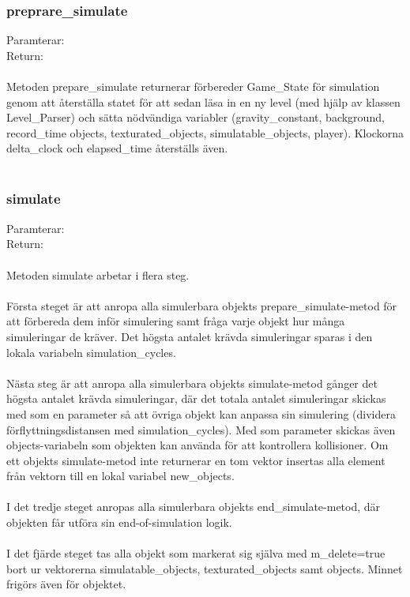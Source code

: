 \documentclass{TDP003mall}
\begin{document}
\subsubsection{preprare\_simulate}
Paramterar: \textit{}
\\Return: \textit{}
\\\\
Metoden prepare\_simulate returnerar förbereder Game\_State för simulation genom att återställa statet för att sedan läsa in en ny level (med hjälp av klassen Level\_Parser) och sätta nödvändiga variabler (gravity\_constant, background, record\_time objects, texturated\_objects, simulatable\_objects, player). Klockorna delta\_clock och elapsed\_time återställs även.
\\\\

\subsubsection{simulate}
Paramterar: \textit{}
\\Return: \textit{}
\\\\
Metoden simulate arbetar i flera steg.
\\\\
Första steget är att anropa alla simulerbara objekts prepare\_simulate-metod för att förbereda dem inför simulering samt fråga varje objekt hur många simuleringar de kräver. Det högsta antalet krävda simuleringar sparas i den lokala variabeln simulation\_cycles.
\\\\
Nästa steg är att anropa alla simulerbara objekts simulate-metod gånger det högsta antalet krävda simuleringar, där det totala antalet simuleringar skickas med som en parameter så att övriga objekt kan anpassa sin simulering (dividera förflyttningsdistansen med simulation\_cycles). Med som parameter skickas även objects-variabeln som objekten kan använda för att kontrollera kollisioner. Om ett objekts simulate-metod inte returnerar en tom vektor insertas alla element från vektorn till en lokal variabel new\_objects.
\\\\
I det tredje steget anropas alla simulerbara objekts end\_simulate-metod, där objekten får utföra sin end-of-simulation logik.
\\\\
I det fjärde steget tas alla objekt som markerat sig själva med m\_delete=true bort ur vektorerna simulatable\_objects, texturated\_objects samt objects. Minnet frigörs även för objektet.
\end{document}
